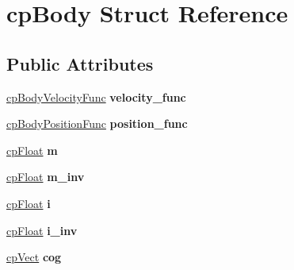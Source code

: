\hypertarget{structcp_body}{}\section{cp\+Body Struct Reference}
\label{structcp_body}
\subsection*{Public Attributes}
\begin{DoxyCompactItemize}
\item 
\mbox{\label{structcp_body_adc333a0be0d7953cad1fb4f6ee49dcf6}} 
\mbox{\hyperlink{group__cp_body_gaa7a1f4706fb8e879c356ae99035ead71}{cp\+Body\+Velocity\+Func}} {\bfseries velocity\+\_\+func}
\item 
\mbox{\label{structcp_body_a7da3dcd9ac7c689a1da1f97b37c292b9}} 
\mbox{\hyperlink{group__cp_body_ga3386e3b0b4156289ab6099cc64c952e7}{cp\+Body\+Position\+Func}} {\bfseries position\+\_\+func}
\item 
\mbox{\label{structcp_body_a883298164e53e4633b3daa4de92a9831}} 
\mbox{\hyperlink{group__basic_types_gac1ed65573e035bf892505768c852d8d3}{cp\+Float}} {\bfseries m}
\item 
\mbox{\label{structcp_body_a204a010e411c0f67e511a69f23d02025}} 
\mbox{\hyperlink{group__basic_types_gac1ed65573e035bf892505768c852d8d3}{cp\+Float}} {\bfseries m\+\_\+inv}
\item 
\mbox{\label{structcp_body_a4a47d0b30594a5fe28dd4de3cdf1450a}} 
\mbox{\hyperlink{group__basic_types_gac1ed65573e035bf892505768c852d8d3}{cp\+Float}} {\bfseries i}
\item 
\mbox{\label{structcp_body_a36b73e662173a240d1d8f09cdd468202}} 
\mbox{\hyperlink{group__basic_types_gac1ed65573e035bf892505768c852d8d3}{cp\+Float}} {\bfseries i\+\_\+inv}
\item 
\mbox{\label{structcp_body_a598e8b270faf8aa58e8a8ad914211810}} 
\mbox{\hyperlink{structcp_vect}{cp\+Vect}} {\bfseries cog}
\item 
\mbox{\label{structcp_body_a2d66ed5ba3aa8fe5ec90371ad6aa5f59}} 

\end{DoxyCompactItemize}
